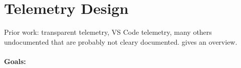 \documentclass[english,submission,cleveref]{programming}
\begin{document}
\begin{table}
\begin{tabular}{ll}
  \end{tabular}
\end{table}

\section{Telemetry Design}

Prior work: transparent telemetry, VS Code telemetry, many others undocumented
that are probably not cleary documented.
 gives an overview.

\paragraph{Goals:}
\end{document}
